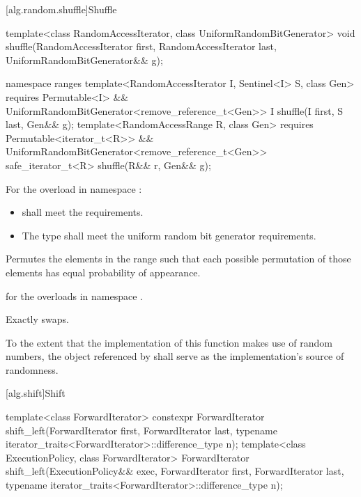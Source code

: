 [alg.random.shuffle]{Shuffle}

%
\begin{itemdecl}
template<class RandomAccessIterator, class UniformRandomBitGenerator>
  void shuffle(RandomAccessIterator first,
               RandomAccessIterator last,
               UniformRandomBitGenerator&& g);

namespace ranges {
  template<RandomAccessIterator I, Sentinel<I> S, class Gen>
    requires Permutable<I> &&
      UniformRandomBitGenerator<remove_reference_t<Gen>>
    I shuffle(I first, S last, Gen&& g);
  template<RandomAccessRange R, class Gen>
    requires Permutable<iterator_t<R>> &&
      UniformRandomBitGenerator<remove_reference_t<Gen>>
    safe_iterator_t<R> shuffle(R&& r, Gen&& g);
}
\end{itemdecl}

\begin{itemdescr}
\pnum
\requires
For the overload in namespace :
\begin{itemize}
\item
{} shall meet the
 requirements.
\item
The type
shall meet the
uniform random bit generator requirements.
\end{itemize}

\pnum
\effects
Permutes the elements in the range
such that each possible permutation of those elements has equal probability of appearance.

\pnum
\returns
{} for the overloads in namespace .

\pnum
\complexity
Exactly
swaps.

\pnum
\remarks
To the extent that the implementation of this function makes use of random
numbers, the object referenced by  shall serve as the implementation's source of
randomness.

\end{itemdescr}

[alg.shift]{Shift}

%
\begin{itemdecl}
template<class ForwardIterator>
  constexpr ForwardIterator
    shift_left(ForwardIterator first, ForwardIterator last,
               typename iterator_traits<ForwardIterator>::difference_type n);
template<class ExecutionPolicy, class ForwardIterator>
  ForwardIterator
    shift_left(ExecutionPolicy&& exec, ForwardIterator first, ForwardIterator last,
               typename iterator_traits<ForwardIterator>::difference_type n);
\end{itemdecl}

